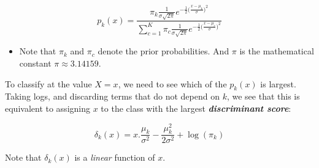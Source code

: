 \documentclass[]{book}
\newenvironment{rmdblock}[1]
  {\begin{shaded*}
  \begin{itemize}
  \renewcommand{\labelitemi}{
    \raisebox{-.7\height}[0pt][0pt]{
      {\setkeys{Gin}{width=2em,keepaspectratio}\texttt{[image: img/icons/\#1]}}
    }
  }
  \item
  }
  {
  \end{itemize}
  \end{shaded*}
  }
\newenvironment{rmdcaution}
  {\begin{rmdblock}{caution}}
  {\end{rmdblock}}
\begin{document}
\begin{equation}
p_k(x) = \frac{  \pi_k \frac{1}{\sigma \sqrt{2\pi}} e^{-\frac{1}{2} \big(\frac{x-\mu_k}{\sigma}\big)^2 } }{  \sum_{c=1}^K  \pi_c \frac{1}{\sigma \sqrt{2\pi}} e^{-\frac{1}{2} \big(\frac{x-\mu_c}{\sigma}\big)^2 } }
\label{eq:pkx}
\end{equation}

\begin{rmdcaution}
Note that \(\pi_k\) and \(\pi_c\) denote the prior probabilities. And
\(\pi\) is the mathematical constant \(\pi \approx 3.14159\).
\end{rmdcaution}

To classify at the value \(X = x\), we need to see which of the
\(p_k(x)\) is largest. Taking logs, and discarding terms that do not
depend on \(k\), we see that this is equivalent to assigning \(x\) to
the class with the largest \textbf{\emph{discriminant score}}:

\begin{equation}
\delta_k(x) = x.\frac{\mu_k}{\sigma^2} - \frac{\mu_k^2}{2\sigma^2} + \log (\pi_k)
\label{eq:discscore}
\end{equation}

Note that \(\delta_k(x)\) is a \emph{linear} function of \(x\).
\end{document}
